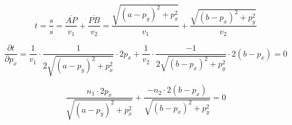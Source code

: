 \begin{refsection}
\begin{equation}\label{tbest}
t=\dfrac{s}{s}=\dfrac{\overline{AP}}{v_{1}}+\dfrac{\overline{PB}}{v_{2}}= 
\dfrac{\sqrt{(a-p_{y})^{2}+p_{x}^{2}}}{v_{1}}+ 
\dfrac{\sqrt{(b-p_{x})^{2}+p_{y}^{2}}}{v_{2}}
\end{equation}

\begin{equation}\label{partdiff}
\dfrac{\partial t}{\partial p_{x}}=
\dfrac{1}{v_{1}}\cdot \dfrac{1}{2 \sqrt{(a-p_{y})^{2}+p_{x}^{2}}}\cdot 2p_{x} +
\dfrac{1}{v_{2}}\cdot \dfrac{-1}{2 \sqrt{(b-p_{x})^{2}+p_{y}^{2}}}\cdot 2(b-p_{x})= 0
\end{equation}

\begin{equation}\label{glp}
\dfrac{n_{1}\cdot 2p_{x} }{\sqrt{(a-p_{y})^{2}+p_{x}^{2}}}+
\dfrac{-n_{2}\cdot 2(b-p_{x})}{\sqrt{(b-p_{x})^{2}+p_{y}^{2}}}= 0
\end{equation}


\end{refsection}
